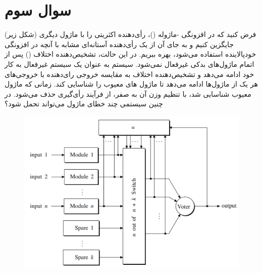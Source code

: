 \section{سوال سوم}


فرض کنید که در افزونگی -ماژوله ()، رأی‌دهنده اکثریتی را با  ماژول دیگری (شکل زیر) جایگزین کنیم و به جای آن از یک رأی‌دهنده آستانه‌ای  مشابه با آنچه در افزونگی خودپالاینده  استفاده می‌شود، بهره ببریم. در این حالت، تشخیص‌دهنده اختلاف () پس از اتمام ماژول‌های بدکی غیرفعال نمی‌شود. سیستم به عنوان یک سیستم  غیرفعال به کار خود ادامه می‌دهد و تشخیص‌دهنده اختلاف به مقایسه خروجی رای‌دهنده با خروجی‌های هر یک از ماژول‌ها ادامه می‌دهد تا ماژول های معیوب را شناسایی کند. زمانی که ماژول معیوب شناسایی شد، با تنظیم وزن آن به صفر، از فرآیند رأی‌گیری حذف می‌شود. در چنین سیستمی چند خطای ماژول می‌تواند تحمل شود؟


\begin{figure}[h]
    \centering
    \includegraphics*[width=0.6\linewidth]{pics/img1.png}
\end{figure}


\begin{qsolve}
	
\end{qsolve}